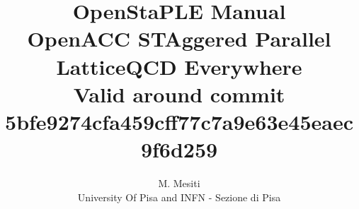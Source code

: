 \documentclass[a4paper,10pt]{scrartcl}
\title{{\Huge \bfseries OpenStaPLE Manual} \\
OpenACC STAggered Parallel LatticeQCD Everywhere \\
{\small Valid around commit 
5bfe9274cfa459cff77c7a9e63e45eaec9f6d259
}}
\author{M. Mesiti\\{\small University Of Pisa and INFN - Sezione di Pisa}}
\begin{document}
\maketitle
\date{}
 

  

  
 
  
  
%  
\end{document}
